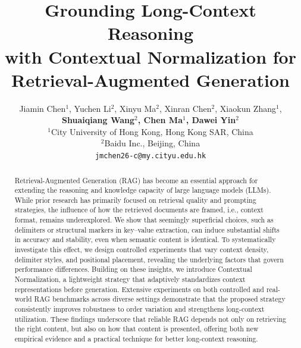 \documentclass{article} %
\title{Grounding Long-Context Reasoning \\ with Contextual Normalization for\\ Retrieval-Augmented Generation}
\author{Jiamin Chen$^1$, Yuchen Li$^2$, Xinyu Ma$^2$, Xinran Chen$^2$, Xiaokun Zhang$^1$, \\
\textbf{Shuaiqiang Wang$^2$, Chen Ma$^1$, Dawei Yin$^2$} \\
$^1$City University of Hong Kong, Hong Kong SAR, China\\
$^2$Baidu Inc., Beijing, China\\
\texttt{jmchen26-c@my.cityu.edu.hk} \\
}
\begin{document}
\maketitle

\begin{abstract}
Retrieval-Augmented Generation (RAG) has become an essential approach for extending the reasoning and knowledge capacity of large language models (LLMs). While prior research has primarily focused on retrieval quality and prompting strategies, the influence of how the retrieved documents are framed, i.e., context format, remains underexplored. We show that seemingly superficial choices, such as delimiters or structural markers in key–value extraction, can induce substantial shifts in accuracy and stability, even when semantic content is identical. To systematically investigate this effect, we design controlled experiments that vary context density, delimiter styles, and positional placement, revealing the underlying factors that govern performance differences. Building on these insights, we introduce Contextual Normalization, a lightweight strategy that adaptively standardizes context representations before generation. Extensive experiments on both controlled and real-world RAG benchmarks across diverse settings demonstrate that the proposed strategy consistently improves robustness to order variation and strengthens long-context utilization. These findings underscore that reliable RAG depends not only on retrieving the right content, but also on how that content is presented, offering both new empirical evidence and a practical technique for better long-context reasoning.
\end{abstract}
\end{document}

